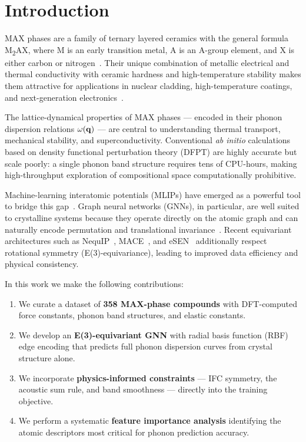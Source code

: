 \section{Introduction}

MAX phases are a family of ternary layered ceramics with the general
formula M\textsubscript{2}AX, where M is an early transition metal,
A is an A-group element, and X is either carbon or nitrogen~\cite{Barsoum2000}.
Their unique combination of metallic electrical and thermal conductivity with
ceramic hardness and high-temperature stability makes them attractive
for applications in nuclear cladding, high-temperature coatings,
and next-generation electronics~\cite{Gogotsi2019}.

The lattice-dynamical properties of MAX phases --- encoded in their
phonon dispersion relations $\omega(\mathbf{q})$ --- are central to understanding
thermal transport, mechanical stability, and superconductivity.
Conventional \textit{ab initio} calculations based on density functional
perturbation theory (DFPT) are highly accurate but scale poorly:
a single phonon band structure requires tens of CPU-hours,
making high-throughput exploration of compositional space
computationally prohibitive.

Machine-learning interatomic potentials (MLIPs) have emerged as a
powerful tool to bridge this gap~\cite{Behler2007,Batzner2022}.
Graph neural networks (GNNs), in particular, are well suited to
crystalline systems because they operate directly on the atomic graph
and can naturally encode permutation and translational invariance~\cite{Xie2018}.
Recent equivariant architectures such as NequIP~\cite{Batzner2022},
MACE~\cite{Batatia2022}, and eSEN~\cite{TODO} additionally respect
rotational symmetry (E(3)-equivariance),
leading to improved data efficiency and physical consistency.

In this work we make the following contributions:
\begin{enumerate}
  \item We curate a dataset of \textbf{358 MAX-phase compounds} with
        DFT-computed force constants, phonon band structures, and
        elastic constants.
  \item We develop an \textbf{E(3)-equivariant GNN} with radial basis
        function (RBF) edge encoding that predicts full phonon
        dispersion curves from crystal structure alone.
  \item We incorporate \textbf{physics-informed constraints} ---
        IFC symmetry, the acoustic sum rule, and band smoothness ---
        directly into the training objective.
  \item We perform a systematic \textbf{feature importance analysis}
        identifying the atomic descriptors most critical for
        phonon prediction accuracy.
\end{enumerate}
